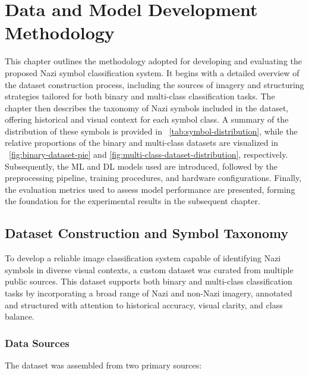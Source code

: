 
\chapter{Data and Model Development Methodology}\label{chapter:methodology}

This chapter outlines the methodology adopted for developing and evaluating the proposed Nazi symbol classification
system. It begins with a detailed overview of the dataset construction process, including the sources of imagery and
structuring strategies tailored for both binary and multi-class classification tasks. The chapter then describes the
taxonomy of Nazi symbols included in the dataset, offering historical and visual context for each symbol class. A
summary of the distribution of these symbols is provided in ~\autoref{tab:symbol-distribution}, while the relative
proportions of the binary and multi-class datasets are visualized in ~\autoref{fig:binary-dataset-pie} and
\autoref{fig:multi-class-dataset-distribution}, respectively. Subsequently, the \ac{ML} and \ac{DL}
models used are introduced, followed by the preprocessing pipeline, training procedures, and hardware
configurations. Finally, the evaluation metrics used to assess model performance are presented, forming the
foundation for the experimental results in the subsequent chapter.


\section{Dataset Construction and Symbol Taxonomy}
\label{sec:data-construction}

To develop a reliable image classification system capable of identifying Nazi symbols in diverse visual contexts, a
custom dataset was curated from multiple public sources. This dataset supports both binary and multi-class
classification tasks by incorporating a broad range of Nazi and non-Nazi imagery, annotated and structured with
attention to historical accuracy, visual clarity, and class balance.

\subsection{Data Sources}

The dataset was assembled from two primary sources:

